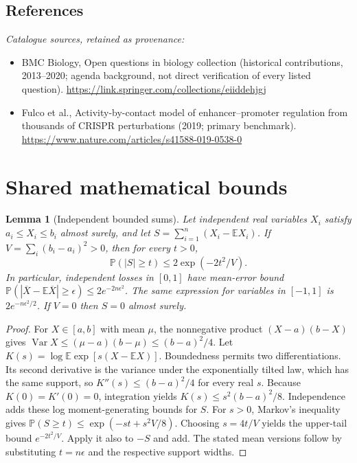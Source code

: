 \documentclass[11pt]{article}
\newcommand{\E}{\mathbb E}
\newcommand{\Prob}{\mathbb P}
\DeclareMathOperator{\Var}{Var}
\providecommand{\E}{\mathbb E}
\providecommand{\Prob}{\mathbb P}
\providecommand{\Var}{\operatorname{Var}}
\newtheorem{sharedlemma}{Lemma}[section]
\begin{document}
\subsection{References}
\noindent\emph{Catalogue sources, retained as provenance:}
\begin{itemize}
\item BMC Biology, Open questions in biology collection (historical contributions, 2013--2020; agenda background, not direct verification of every listed question). \url{https://link.springer.com/collections/eiiddehjgj}
\item Fulco et al., Activity-by-contact model of enhancer--promoter regulation from thousands of CRISPR perturbations (2019; primary benchmark). \url{https://www.nature.com/articles/s41588-019-0538-0}
\end{itemize}
\clearpage


\appendix
\section{Shared mathematical bounds}\label{app:bounds}
\begin{sharedlemma}[Independent bounded sums]\label{lem:bounded}
Let independent real variables $X_i$ satisfy $a_i\leq X_i\leq b_i$ almost surely,
and let $S=\sum_{i=1}^n(X_i-\E X_i)$. If
$V=\sum_i(b_i-a_i)^2>0$, then for every $t>0$,
\[
 \Prob(|S|\geq t)\leq 2\exp(-2t^2/V).
\]
In particular, independent losses in $[0,1]$ have mean-error bound
$\Prob(|\overline X-\E\overline X|\geq\epsilon)
\leq2e^{-2n\epsilon^2}$. The same expression for variables in $[-1,1]$
is $2e^{-n\epsilon^2/2}$. If $V=0$ then $S=0$ almost surely.
\end{sharedlemma}
\begin{proof}
For $X\in[a,b]$ with mean $\mu$, the nonnegative product
$(X-a)(b-X)$ gives
$\Var X\leq(\mu-a)(b-\mu)\leq(b-a)^2/4$.
Let $K(s)=\log\E\exp[s(X-\E X)]$.
Boundedness permits two differentiations. Its second derivative is the variance
under the exponentially tilted law, which has the same support, so
$K''(s)\leq(b-a)^2/4$ for every real $s$.
Because $K(0)=K'(0)=0$, integration yields
$K(s)\leq s^2(b-a)^2/8$.
Independence adds these log moment-generating bounds for $S$.
For $s>0$, Markov's inequality gives
$\Prob(S\geq t)\leq\exp(-st+s^2V/8)$.
Choosing $s=4t/V$ yields the upper-tail bound $e^{-2t^2/V}$.
Apply it also to $-S$ and add. The stated mean versions follow by substituting
$t=n\epsilon$ and the respective support widths.
\end{proof}
\end{document}

